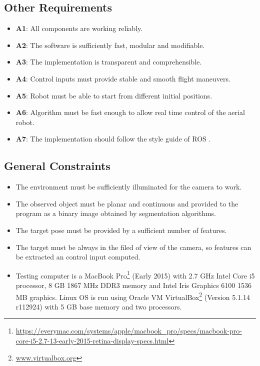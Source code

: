\subsection{Other Requirements}
\label{sec:other-requirements}

\begin{itemize}
	\item \textbf{A1}: All components are working reliably.
	\item \textbf{A2}: The software is sufficiently fast, modular and modifiable.
	\item \textbf{A3}: The implementation is transparent and comprehensible.
	\item \textbf{A4}: Control inputs must provide stable and smooth flight maneuvers.
	\item \textbf{A5}: Robot must be able to start from different initial positions.
	\item \textbf{A6}: Algorithm must be fast enough to allow real time control of the aerial robot.
	\item \textbf{A7}: The implementation should follow the style guide of ROS \cite{ROS_Style}.
\end{itemize}

\subsection{General Constraints}
\label{sec:general-constraints}

\begin{itemize}
	\item The environment must be sufficiently illuminated for the camera to work.
	\item The observed object must be planar and continuous and provided to the program as a binary image obtained by segmentation algorithms.
	\item The target pose must be provided by a sufficient number of features.
	\item The target must be always in the filed of view of the camera, so features can be extracted an control input computed.
	\item Testing computer is a MacBook Pro\footnote{\url{https://everymac.com/systems/apple/macbook_pro/specs/macbook-pro-core-i5-2.7-13-early-2015-retina-display-specs.html}} (Early 2015) with 2.7 GHz Intel Core i5 processor, 8 GB 1867 MHz DDR3 memory and Intel Iris Graphics 6100 1536 MB graphics. Linux OS is run using Oracle VM VirtualBox\footnote{\url{www.virtualbox.org}} (Version 5.1.14 r112924) with 5 GB base memory and two processors.
\end{itemize}

